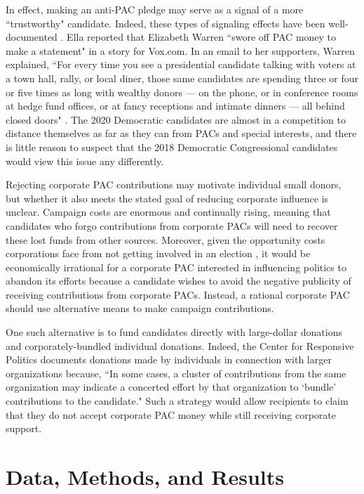 \documentclass[12pt]{article}
\begin{document}
In effect, making an anti-PAC pledge may serve as a signal of a more ``trustworthy" candidate. Indeed, these types of signaling effects have been well-documented \citep{iyengar1989}. Ella \citet{nilsen2019} reported that Elizabeth Warren ``swore off PAC money to make a statement" in a story for Vox.com. In an email to her supporters, Warren explained, ``For every time you see a presidential candidate talking with voters at a town hall, rally, or local diner, those same candidates are spending three or four or five times as long with wealthy donors — on the phone, or in conference rooms at hedge fund offices, or at fancy receptions and intimate dinners — all behind closed doors" \citep{nilsen2019}. The 2020 Democratic candidates are almost in a competition to distance themselves as far as they can from PACs and special interests, and there is little reason to suspect that the 2018 Democratic Congressional candidates would view this issue any differently. 

Rejecting corporate PAC contributions may motivate individual small donors, but whether it also meets the stated goal of reducing corporate influence is unclear. Campaign costs are enormous and continually rising, meaning that candidates who forgo contributions from corporate PACs will need to recover these lost funds from other sources. Moreover, given the opportunity costs corporations face from not getting involved in an election \citep{denzau1986, grier1986, kroszner1998}, it would be economically irrational for a corporate PAC interested in influencing politics to abandon its efforts because a candidate wishes to avoid the negative publicity of receiving contributions from corporate PACs. Instead, a rational corporate PAC should use alternative means to make campaign contributions. 

One such alternative is to fund candidates directly with large-dollar donations and corporately-bundled individual donations. Indeed, the Center for Responsive Politics documents donations made by individuals in connection with larger organizations because, ``In some cases, a cluster of contributions from the same organization may indicate a concerted effort by that organization to `bundle' contributions to the candidate." Such a strategy would allow recipients to claim that they do not accept corporate PAC money while still receiving corporate support. 


\section{Data, Methods, and Results}
\end{document}
